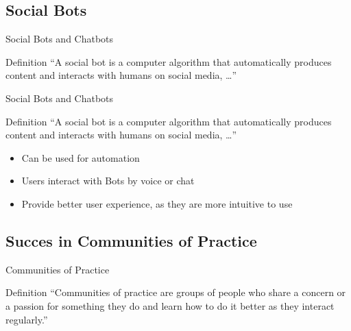 \subsection{Social Bots}
\begin{frame}{Social Bots and Chatbots}
  \begin{block}{Definition}
    ``A social bot is a computer algorithm that automatically produces content and interacts with humans on social media, \dots'' \cite{FVD*16b}
  \end{block}
\end{frame}
\begin{frame}{Social Bots and Chatbots}
  \begin{block}{Definition}
    ``A social bot is a computer algorithm that automatically produces content and interacts with humans on social media, \dots'' \cite{FVD*16b}
  \end{block}
  \begin{itemize}
    \item Can be used for automation  %
    \item Users interact with Bots by voice or chat %
    \item Provide better user experience, as they are more intuitive to use
  \end{itemize}
\end{frame}

\subsection{Succes in Communities of Practice}
\begin{frame}{Communities of Practice}
  \begin{block}{Definition}
    ``Communities of practice are groups of people who share a concern or a
    passion for something they do and learn how to do it better as they interact regularly.'' \cite{Weng98}
  \end{block}
\end{frame}

